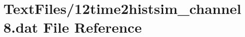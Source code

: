 \hypertarget{12time2histsim__channel8_8dat}{}\section{Text\+Files/12time2histsim\+\_\+channel8.dat File Reference}
\label{12time2histsim__channel8_8dat}
